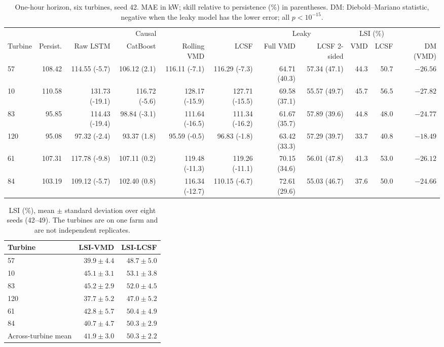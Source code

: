 \documentclass[review,3p,times]{elsarticle}
\begin{document}
\begin{table}[htbp]\centering
\caption{One-hour horizon, six turbines, seed 42. MAE in kW; skill relative to
persistence (\%) in parentheses. DM: Diebold--Mariano statistic, negative when
the leaky model has the lower error; all $p<10^{-15}$.}
\label{tab:sixturbines}
\scriptsize
\begin{tabular}{lrrrrrrrrrr}
\toprule
& \multicolumn{5}{c}{Causal} & \multicolumn{2}{c}{Leaky} &
\multicolumn{2}{c}{LSI (\%)} & \\
\cmidrule(lr){2-6}\cmidrule(lr){7-8}\cmidrule(lr){9-10}
Turbine & Persist. & Raw LSTM & CatBoost & Rolling VMD & LCSF &
Full VMD & LCSF 2-sided & VMD & LCSF & DM (VMD) \\
\midrule
57  & 108.42 & 114.55 (-5.7)  & 106.12 (2.1)  & 116.11 (-7.1)  & 116.29 (-7.3)  & 64.71 (40.3) & 57.34 (47.1) & 44.3 & 50.7 & $-26.56$ \\
10  & 110.58 & 131.73 (-19.1) & 116.72 (-5.6) & 128.17 (-15.9) & 127.71 (-15.5) & 69.58 (37.1) & 55.57 (49.7) & 45.7 & 56.5 & $-27.82$ \\
83  &  95.85 & 114.43 (-19.4) &  98.84 (-3.1) & 111.64 (-16.5) & 111.34 (-16.2) & 61.67 (35.7) & 57.89 (39.6) & 44.8 & 48.0 & $-24.77$ \\
120 &  95.08 &  97.32 (-2.4)  &  93.37 (1.8)  &  95.59 (-0.5)  &  96.83 (-1.8)  & 63.42 (33.3) & 57.29 (39.7) & 33.7 & 40.8 & $-18.49$ \\
61  & 107.31 & 117.78 (-9.8)  & 107.11 (0.2)  & 119.48 (-11.3) & 119.26 (-11.1) & 70.15 (34.6) & 56.01 (47.8) & 41.3 & 53.0 & $-26.12$ \\
84  & 103.19 & 109.12 (-5.7)  & 102.40 (0.8)  & 116.34 (-12.7) & 110.15 (-6.7)  & 72.61 (29.6) & 55.03 (46.7) & 37.6 & 50.0 & $-24.66$ \\
\bottomrule
\end{tabular}
\end{table}

\begin{table}[htbp]\centering
\caption{LSI (\%), mean $\pm$ standard deviation over eight seeds (42--49).
The turbines are on one farm and are not independent replicates.}
\label{tab:seeds}
\footnotesize
\begin{tabular}{lrr}
\toprule
Turbine & LSI-VMD & LSI-LCSF \\
\midrule
57  & $39.9\pm4.4$ & $48.7\pm5.0$ \\
10  & $45.1\pm3.1$ & $53.1\pm3.8$ \\
83  & $45.2\pm2.9$ & $52.0\pm4.5$ \\
120 & $37.7\pm5.2$ & $47.0\pm5.2$ \\
61  & $42.8\pm5.7$ & $50.4\pm4.9$ \\
84  & $40.7\pm4.7$ & $50.3\pm2.9$ \\
\midrule
Across-turbine mean & $41.9\pm3.0$ & $50.3\pm2.2$ \\
\bottomrule
\end{tabular}
\end{table}
\end{document}
